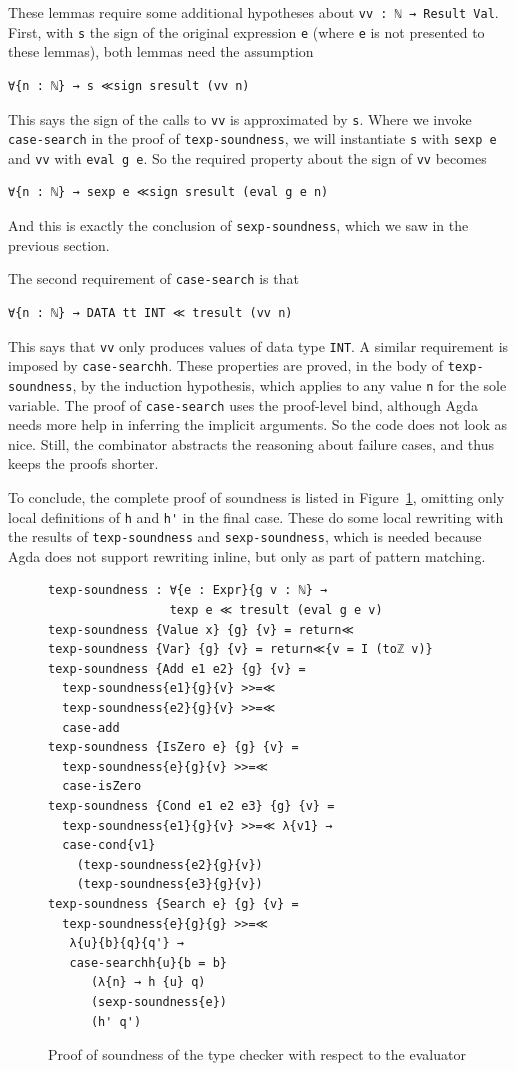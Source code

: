 \documentclass[acmsmall,screen,review]{acmart}
\begin{document}
These lemmas require some additional hypotheses about
\verb|vv : ℕ → Result Val|.  First, with
\verb|s| the sign of the original expression \verb|e| (where \verb|e|
is not presented to these lemmas), both lemmas need the assumption
\begin{verbatim}
∀{n : ℕ} → s ≪sign sresult (vv n)
\end{verbatim}
\noindent This says the sign of the calls to \verb|vv| is approximated
by \verb|s|.  Where we invoke \verb|case-search| in the proof of
\verb|texp-soundness|, we will instantiate \verb|s| with \verb|sexp e|
and \verb|vv| with \verb|eval g e|.  So the required property about
the sign of \verb|vv| becomes
\begin{verbatim}
∀{n : ℕ} → sexp e ≪sign sresult (eval g e n)
\end{verbatim}
\noindent And this is exactly the conclusion of \verb|sexp-soundness|, which
we saw in the previous section.

The second requirement of \verb|case-search| is that
\begin{verbatim}
∀{n : ℕ} → DATA tt INT ≪ tresult (vv n)
\end{verbatim}
\noindent This says that \verb|vv| only produces values of data type \verb|INT|.
A similar requirement is imposed by \verb|case-searchh|.  These properties
are proved, in the body of \verb|texp-soundness|, by the induction
hypothesis, which applies to any value \verb|n| for the sole variable.
The proof of \verb|case-search| uses the proof-level bind, although Agda
needs more help in inferring the implicit arguments.  So the code does
not look as nice.  Still, the combinator abstracts the reasoning about
failure cases, and thus keeps the proofs shorter.

To conclude, the complete proof of soundness is listed in
Figure~\ref{fig:texpsnd}, omitting only local definitions of \verb|h|
and \verb|h'| in the final case.  These do some local rewriting with
the results of \verb|texp-soundness| and \verb|sexp-soundness|, which
is needed because Agda does not support rewriting inline, but only as
part of pattern matching.

\begin{figure}
\begin{verbatim}
texp-soundness : ∀{e : Expr}{g v : ℕ} →
                 texp e ≪ tresult (eval g e v)
texp-soundness {Value x} {g} {v} = return≪
texp-soundness {Var} {g} {v} = return≪{v = I (toℤ v)}
texp-soundness {Add e1 e2} {g} {v} = 
  texp-soundness{e1}{g}{v} >>=≪
  texp-soundness{e2}{g}{v} >>=≪
  case-add
texp-soundness {IsZero e} {g} {v} = 
  texp-soundness{e}{g}{v} >>=≪
  case-isZero  
texp-soundness {Cond e1 e2 e3} {g} {v} = 
  texp-soundness{e1}{g}{v} >>=≪ λ{v1} → 
  case-cond{v1}
    (texp-soundness{e2}{g}{v})
    (texp-soundness{e3}{g}{v})
texp-soundness {Search e} {g} {v} =  
  texp-soundness{e}{g}{g} >>=≪
   λ{u}{b}{q}{q'} → 
   case-searchh{u}{b = b}
      (λ{n} → h {u} q)
      (sexp-soundness{e})
      (h' q')
\end{verbatim}
\caption{Proof of soundness of the type checker with respect to the evaluator}
\label{fig:texpsnd}
\end{figure}
\end{document}
